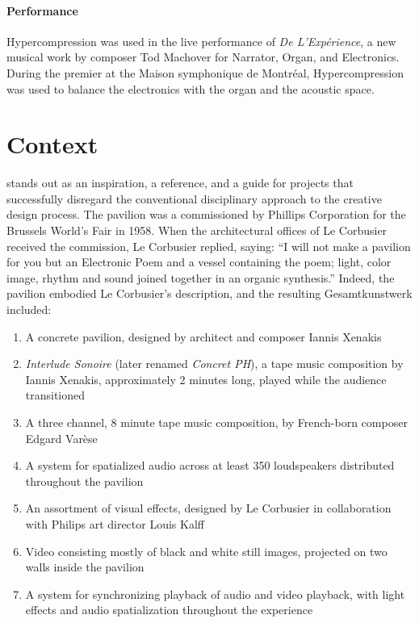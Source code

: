 \documentclass{tufte-book}
\newcommand{\thesis}{Hypercompression\xspace}
\begin{document}
\paragraph{Performance}
\thesis was used in the live performance of \textit{De
  L'Exp\'{e}rience}, a new musical work by composer Tod Machover for
Narrator, Organ, and Electronics. During the premier at the Maison
symphonique de Montr\'{e}al, \thesis was used to balance the
electronics with the organ and the acoustic space.

\section{Context}
\label{sec:context}

 stands out as an inspiration, a
reference, and a guide for projects that successfully disregard the
conventional disciplinary approach to the creative design process. The
pavilion was a commissioned by Phillips Corporation for the Brussels
World's Fair in 1958.\cite{Zvonar1999} When the architectural offices of
Le Corbusier received the commission, Le Corbusier replied, saying:
``I will not make a pavilion for you but an Electronic Poem and a
vessel containing the poem; light, color image, rhythm and sound
joined together in an organic synthesis.''\cite{Lopez2011} Indeed,
the pavilion embodied Le Corbusier's description, and the resulting
Gesamtkunstwerk included:\cite{Lombardo2009}
\begin{enumerate}
\item A concrete pavilion, designed by architect and composer Iannis
  Xenakis
\item \textit{Interlude Sonoire} (later renamed \textit{Concret PH}), a
  tape music composition by Iannis Xenakis, approximately 2 minutes
  long, played while the audience transitioned
\item A three channel, 8 minute tape music composition, by French-born
  composer Edgard Var\`{e}se
\item A system for spatialized audio across at least 350 loudspeakers
  distributed throughout the pavilion
\item An assortment of visual effects, designed by Le Corbusier in
  collaboration with Philips art director Louis Kalff
\item Video consisting mostly of black and white still images,
  projected on two walls inside the pavilion
\item A system for synchronizing playback of audio and video playback,
  with light effects and audio spatialization throughout the
  experience
\end{enumerate} 
\end{document}
